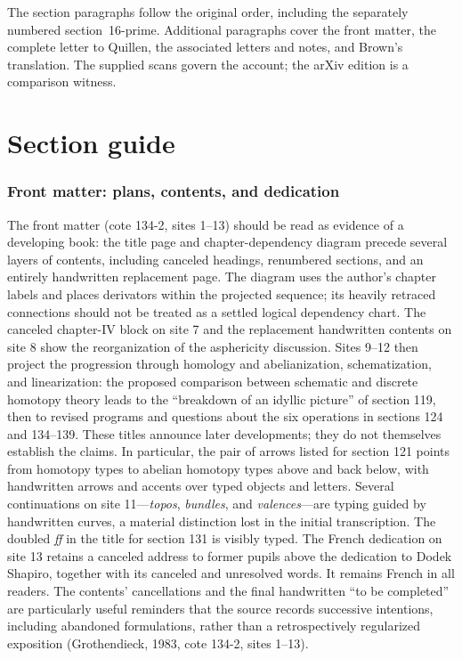 \documentclass[10pt,oneside]{book}
\begin{document}
The section paragraphs follow the original order, including the separately numbered section~16-prime. Additional paragraphs cover the front matter, the complete letter to Quillen, the associated letters and notes, and Brown's translation. The supplied scans govern the account; the arXiv edition is a comparison witness.
\chapter*{Section guide}
\subsection*{Front matter: plans, contents, and dedication}
The front matter (cote 134-2, sites 1--13) should be read as evidence of a developing book: the title page and chapter-dependency diagram precede several layers of contents, including canceled headings, renumbered sections, and an entirely handwritten replacement page. The diagram uses the author's chapter labels and places derivators within the projected sequence; its heavily retraced connections should not be treated as a settled logical dependency chart. The canceled chapter-IV block on site 7 and the replacement handwritten contents on site 8 show the reorganization of the asphericity discussion. Sites 9--12 then project the progression through homology and abelianization, schematization, and linearization: the proposed comparison between schematic and discrete homotopy theory leads to the ``breakdown of an idyllic picture'' of section 119, then to revised programs and questions about the six operations in sections 124 and 134--139. These titles announce later developments; they do not themselves establish the claims. In particular, the pair of arrows listed for section 121 points from homotopy types to abelian homotopy types above and back below, with handwritten arrows and accents over typed objects and letters. Several continuations on site 11---\emph{topos}, \emph{bundles}, and \emph{valences}---are typing guided by handwritten curves, a material distinction lost in the initial transcription. The doubled \emph{ff} in the title for section 131 is visibly typed. The French dedication on site 13 retains a canceled address to former pupils above the dedication to Dodek Shapiro, together with its canceled and unresolved words. It remains French in all readers. The contents' cancellations and the final handwritten ``to be completed'' are particularly useful reminders that the source records successive intentions, including abandoned formulations, rather than a retrospectively regularized exposition (Grothendieck, 1983, cote 134-2, sites 1--13).
\end{document}
